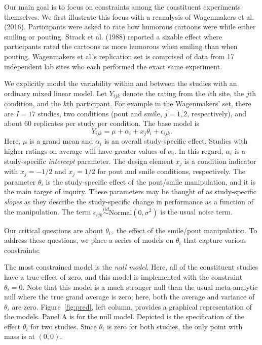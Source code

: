 \documentclass[english,man]{apa6}
\theoremstyle{definition}
\theoremstyle{definition}
\theoremstyle{remark}
\begin{document}
Our main goal is to focus on constraints among the constituent
experiments themselves. We first illustrate this focus with a reanalysis
of Wagenmakers et al. (2016). Participants were asked to rate how
humorous cartoons were while either smiling or pouting. Strack et al.
(1988) reported a sizable effect where participants rated the cartoons
as more humorous when smiling than when pouting. Wagenmakers et al.'s
replication set is comprised of data from 17 independent lab sites who
each performed the exact same experiment.

We explicitly model the variability within and between the studies with
an ordinary mixed linear model. Let \(Y_{ijk}\) denote the rating from
the \(i\)th site, the \(j\)th condition, and the \(k\)th participant.
For example in the Wagenmakers' set, there are \(I=17\) studies, two
conditions (pout and smile, \(j=1,2\), respectively), and about 60
replicates per study per condition. The base model is \[
Y_{ijk} = \mu+\alpha_i + x_j\theta_i+\epsilon_{ijk}.
\] Here, \(\mu\) is a grand mean and \(\alpha_i\) is an overall
study-specific effect. Studies with higher ratings on average will have
greater values of \(\alpha_i\). In this regard, \(\alpha_i\) is a
study-specific \emph{intercept} parameter. The design element \(x_j\) is
a condition indicator with \(x_j=-1/2\) and \(x_j=1/2\) for pout and
smile conditions, respectively. The parameter \(\theta_i\) is the
study-specific effect of the pout/smile manipulation, and it is the main
target of inquiry. These parameters may be thought of as study-specific
\emph{slopes} as they describe the study-specific change in performance
as a function of the manipulation. The term
\(\epsilon_{ijk}\stackrel{iid}{\sim}\mbox{Normal}(0,\sigma^2)\) is the
usual noise term.

Our critical questions are about \(\theta_i,\) the effect of the
smile/pout manipulation. To address these questions, we place a series
of models on \(\theta_i\) that capture various constraints:

The most constrained model is the \emph{null model}. Here, all of the
constituent studies have a true effect of zero, and this model is
implemented with the constraint \(\theta_i=0\). Note that this model is
a much stronger null than the usual meta-analytic null where the true
grand average is zero; here, both the average and variance of
\(\theta_i\) are zero. Figure~\ref{fig:pred}, left column, provides a
graphical representation of the models. Panel A is for the null model.
Depicted is the specification of the effect \(\theta_i\) for two
studies. Since \(\theta_i\) is zero for both studies, the only point
with mass is at \((0,0)\).
\end{document}
